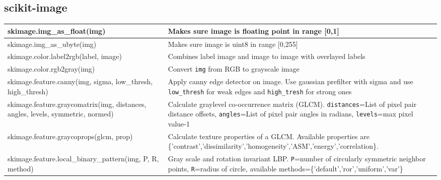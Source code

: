 \subsection{scikit-image}
\begin{tabularx}{\textwidth}{t{8cm} X}
    \hline
    skimage.img\_as\_float(img)                                                                        & Makes sure image is floating point in range [0,1]                                                                                                                                                \\\hline
    skimage.img\_as\_ubyte(img)                                                                        & Makes sure image is uint8 in range [0,255]                                                                                                                                                       \\\hline

    skimage.color.label2rgb(label, image)                                                              & Combines label image and image to image with overlayed labels                                                                                                                                    \\\hline
    skimage.color.rgb2gray(img)                                                                        & Convert \texttt{img} from RGB to grayscale image                                                                                                                                                 \\\hline

    skimage.feature.canny(img, sigma, low\_thresh, high\_thresh)                                       & Apply canny edge detector on image. Use gaussian prefilter with sigma and use \texttt{low\_thresh} for weak edges and \texttt{high\_tresh} for strong ones                                       \\\hline
    skimage.feature.graycomatrix(img, distances, angles, levels, symmetric, normed)                    & Calculate graylevel co-occurrence matrix (GLCM). \texttt{distances}=List of pixel pair distance offsets, \texttt{angles}=List of pixel pair angles in radians, \texttt{levels}=max pixel value-1 \\\hline
    skimage.feature.graycoprops(glcm, prop)                                                            & Calculate texture properties of a GLCM. Available properties are \{'contrast','dissimilarity','homogeneity','ASM','energy','correlation\}.                                                       \\\hline
    skimage.feature.local\_binary\_pattern(img, P, R, method)                                          & Gray scale and rotation invariant LBP. \texttt{P}=number of circularly symmetric neighbor points, \texttt{R}=radius of circle, available methods=\{'default','ror','uniform','var'\}             \\\hline


\end{tabularx}
